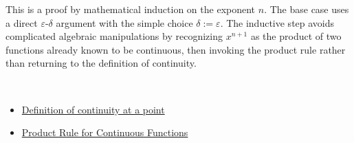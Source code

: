 \begin{remark*}
This is a proof by mathematical induction on the exponent $n$. The base case uses a direct $\varepsilon$-$\delta$ argument with the simple choice $\delta := \varepsilon$. The inductive step avoids complicated algebraic manipulations by recognizing $x^{n+1}$ as the product of two functions already known to be continuous, then invoking the product rule rather than returning to the definition of continuity.
\end{remark*}

\begin{remark*}[Dependencies]~\\
\begin{itemize}
  \item \hyperref[def:continuous-at-point]{Definition of continuity at a point}
  \item \hyperref[thm:product-rule-continuous-functions]{Product Rule for Continuous Functions}
\end{itemize}
\end{remark*}
